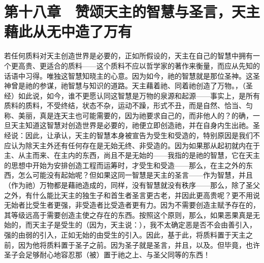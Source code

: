 
\section{第十八章　赞颂天主的智慧与圣言，天主藉此从无中造了万有}

若任何质料对天主创造世界是必要的，正如所假设的，天主在自己的智慧中拥有一个更高贵、更适合的质料——这个质料不应以哲学家的著作来衡量，而应从先知的话语中习得。唯独这智慧知晓主的心意。因为如今，祂的智慧就是那位圣神。这圣神曾是祂的参谋，祂智慧与知识的道路。天主藉着祂、同着祂创造了万物。，（圣经）如此说，如今，谁不更愿认同这智慧是万物的泉源和起源——事实上，是所有质料的质料，不受终结，状态不杂，运动不躁，形式不丑，而是自然、恰当、匀称、美丽，真是连天主也可能需要的，因为祂要求自己的，而非他人的？的确，一旦天主知道这智慧对创造世界是必要的，祂便立即创造祂，并在自身内生出祂。圣经说：因此，让承认，天主的智慧本身被宣告为受生和受造的，特别原因是我们不应认为除天主外还有任何存在是无始无终、非受造的。因为如果那从起初就内在于主、从主而来、在主内的东西，尚且不是无始的——我指的是祂的智慧，它在天主的思想中开始为安排创造工程而运筹时，才受生和受造——那么，在主之外的东西，怎么可能没有起始呢？但如果这同一智慧是天主的圣言——作为智慧，并且（作为祂）万物都是藉祂造成的，同样，没有智慧就没有秩序——那么，除了圣父之外，有什么能比天主的独生子和首生者圣言更古老，并因此更高贵呢？更不用说无始者比受生者更强，非受造者比受造者更有力。因为不需要创造主赋予存在的，其等级远高于需要创造主使之存在的东西。按照这个原则，那么，如果恶果真是无始的，而天主子是受生的（因为，天主说：），我不太确定恶是否不会由善引入，强的由弱的引入，正如无始的由受生的引入。因此，基于此，将质料置于天主之前，因为他将质料置于圣子之前。因为圣子就是圣言，并且，以及。但毕竟，也许圣子会足够耐心地容忍那（被）置于祂之上、与圣父同等的东西！\par

